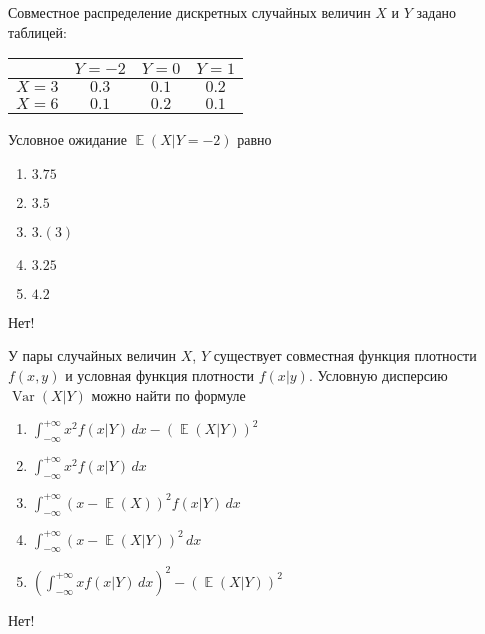 \documentclass[t]{beamer}
\DeclareMathOperator{\Var}{Var}
\DeclareMathOperator{\E}{\mathbb{E}}
\begin{document}
 \begin{frame} \label{6-No} 
\begin{block}{6} 

Совместное распределение дискретных случайных величин $X$ и $Y$ задано таблицей:

\begin{center}
	\begin{tabular}{cccc}
		\toprule
		& $Y=-2$ & $Y=0$ & $Y=1$ \\
		\midrule
		$X=3$ & $0.3$ & $0.1$ & $0.2$  \\
		$X=6$ & $0.1$ & $0.2$ & $0.1$ \\
		\bottomrule
	\end{tabular}
\end{center}

Условное ожидание $\E(X|Y=-2)$ равно

 


 \end{block} 
\begin{enumerate} 
\item[] \hyperlink{6-Yes}{\beamergotobutton{} $3.75$}
\item[] \hyperlink{6-No}{\beamergotobutton{} $3.5$}
\item[] \hyperlink{6-No}{\beamergotobutton{} $3.(3)$}
\item[] \hyperlink{6-No}{\beamergotobutton{} $3.25$}
\item[] \hyperlink{6-No}{\beamergotobutton{} $4.2$}
\end{enumerate} 

 \alert{Нет!} 
\end{frame} 


 \begin{frame} \label{7-No} 
\begin{block}{7} 

У пары случайных величин $X$, $Y$ существует совместная функция плотности $f(x,y)$ и условная функция плотности $f(x|y)$. Условную дисперсию $\Var(X|Y)$ можно найти по формуле
  


 \end{block} 
\begin{enumerate} 
\item[] \hyperlink{7-Yes}{\beamergotobutton{} $\int_{-\infty}^{+\infty} x^2 f(x|Y) \, dx - (\E(X|Y))^2$}
\item[] \hyperlink{7-No}{\beamergotobutton{} $\int_{-\infty}^{+\infty} x^2 f(x|Y) \, dx$}
\item[] \hyperlink{7-No}{\beamergotobutton{} $\int_{-\infty}^{+\infty} (x - \E(X))^2 f(x|Y) \, dx$}
\item[] \hyperlink{7-No}{\beamergotobutton{} $\int_{-\infty}^{+\infty} (x - \E(X|Y))^2 \, dx$}
\item[] \hyperlink{7-No}{\beamergotobutton{} $\left(\int_{-\infty}^{+\infty} x f(x|Y) \, dx\right)^2 - (\E(X|Y))^2$}
\end{enumerate} 

 \alert{Нет!} 
\end{frame} 
\end{document}
